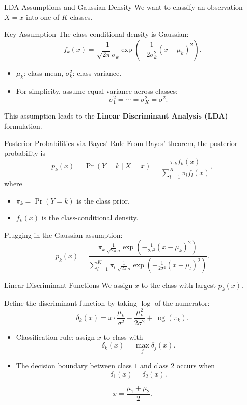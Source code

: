 \documentclass[../../generative_classifiers.tex]{subfiles}
\begin{document}
\begin{frame}{LDA Assumptions and Gaussian Density}
We want to classify an observation $X=x$ into one of $K$ classes.

\begin{block}{Key Assumption}
The class-conditional density is Gaussian:
\[
f_k(x) = \frac{1}{\sqrt{2\pi}\sigma_k} 
\exp\!\left( -\frac{1}{2\sigma_k^2}(x - \mu_k)^2 \right).
\]
\end{block}

\begin{itemize}
    \item $\mu_k$: class mean, $\sigma_k^2$: class variance.
    \item For simplicity, assume equal variance across classes:
    \[
    \sigma_1^2 = \cdots = \sigma_K^2 = \sigma^2.
    \]
\end{itemize}

This assumption leads to the \textbf{Linear Discriminant Analysis (LDA)} formulation.
\end{frame}

\begin{frame}{Posterior Probabilities via Bayes' Rule}
From Bayes’ theorem, the posterior probability is
\[
p_k(x) = \Pr(Y=k \mid X=x) =
\frac{\pi_k f_k(x)}{\sum\limits_{l=1}^K \pi_l f_l(x)},
\]
where
\begin{itemize}
    \item $\pi_k = \Pr(Y=k)$ is the class prior,
    \item $f_k(x)$ is the class-conditional density.
\end{itemize}

Plugging in the Gaussian assumption:
\[
p_k(x) = 
\frac{\pi_k \,\frac{1}{\sqrt{2\pi}\sigma} 
\exp\!\left( -\frac{1}{2\sigma^2}(x - \mu_k)^2 \right)}
{\sum\limits_{l=1}^K \pi_l \,\frac{1}{\sqrt{2\pi}\sigma} 
\exp\!\left( -\frac{1}{2\sigma^2}(x - \mu_l)^2 \right)}.
\]
\end{frame}

\begin{frame}{Linear Discriminant Functions}
We assign $x$ to the class with largest $p_k(x)$.  

Define the discriminant function by taking $\log$ of the numerator:
\[
\delta_k(x) = x \cdot \frac{\mu_k}{\sigma^2} 
- \frac{\mu_k^2}{2\sigma^2} + \log(\pi_k).
\]

\begin{itemize}
    \item Classification rule: assign $x$ to class with
    \[
    \delta_k(x) = \max_{j} \delta_j(x).
    \]
    \item The decision boundary between class $1$ and class $2$ occurs when
    \[
    \delta_1(x) = \delta_2(x).
    \]
\end{itemize}

\[
x = \frac{\mu_1 + \mu_2}{2}.
\]
\end{frame}
\end{document}
